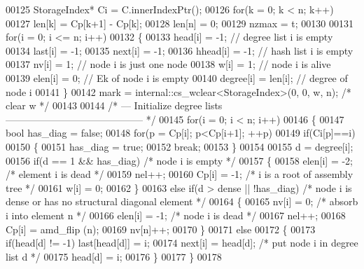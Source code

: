 \begin{DoxyCode}
00125   StorageIndex* Ci = C.innerIndexPtr();
00126   \textcolor{keywordflow}{for}(k = 0; k < n; k++)
00127     len[k] = Cp[k+1] - Cp[k];
00128   len[n] = 0;
00129   nzmax = t;
00130   
00131   \textcolor{keywordflow}{for}(i = 0; i <= n; i++)
00132   \{
00133     head[i]   = -1;                     \textcolor{comment}{// degree list i is empty}
00134     last[i]   = -1;
00135     next[i]   = -1;
00136     hhead[i]  = -1;                     \textcolor{comment}{// hash list i is empty }
00137     nv[i]     = 1;                      \textcolor{comment}{// node i is just one node}
00138     w[i]      = 1;                      \textcolor{comment}{// node i is alive}
00139     elen[i]   = 0;                      \textcolor{comment}{// Ek of node i is empty}
00140     degree[i] = len[i];                 \textcolor{comment}{// degree of node i}
00141   \}
00142   mark = internal::cs\_wclear<StorageIndex>(0, 0, w, n);         \textcolor{comment}{/* clear w */}
00143   
00144   \textcolor{comment}{/* --- Initialize degree lists ------------------------------------------ */}
00145   \textcolor{keywordflow}{for}(i = 0; i < n; i++)
00146   \{
00147     \textcolor{keywordtype}{bool} has\_diag = \textcolor{keyword}{false};
00148     \textcolor{keywordflow}{for}(p = Cp[i]; p<Cp[i+1]; ++p)
00149       \textcolor{keywordflow}{if}(Ci[p]==i)
00150       \{
00151         has\_diag = \textcolor{keyword}{true};
00152         \textcolor{keywordflow}{break};
00153       \}
00154    
00155     d = degree[i];
00156     \textcolor{keywordflow}{if}(d == 1 && has\_diag)           \textcolor{comment}{/* node i is empty */}
00157     \{
00158       elen[i] = -2;                 \textcolor{comment}{/* element i is dead */}
00159       nel++;
00160       Cp[i] = -1;                   \textcolor{comment}{/* i is a root of assembly tree */}
00161       w[i] = 0;
00162     \}
00163     \textcolor{keywordflow}{else} \textcolor{keywordflow}{if}(d > dense || !has\_diag)  \textcolor{comment}{/* node i is dense or has no structural diagonal element */}
00164     \{
00165       nv[i] = 0;                    \textcolor{comment}{/* absorb i into element n */}
00166       elen[i] = -1;                 \textcolor{comment}{/* node i is dead */}
00167       nel++;
00168       Cp[i] = amd\_flip (n);
00169       nv[n]++;
00170     \}
00171     \textcolor{keywordflow}{else}
00172     \{
00173       \textcolor{keywordflow}{if}(head[d] != -1) last[head[d]] = i;
00174       next[i] = head[d];           \textcolor{comment}{/* put node i in degree list d */}
00175       head[d] = i;
00176     \}
00177   \}
00178   

\end{DoxyCode}
